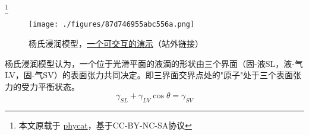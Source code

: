 
\begin{issues}
\issueDraft
\end{issues}

\footnote{本文原载于 \href{https://www.phycat.cn/archives/230/}{phycat}，基于CC-BY-NC-SA协议}

\begin{figure}[ht]
\centering
\texttt{[image: ./figures/87d746955abc556a.png]}
\caption{杨氏浸润模型，\href{https://www.phycat.cn/archives/230/}{一个可交互的演示}（站外链接）} \label{fig_YNGMDL_1}
\end{figure}
杨氏浸润模型认为，一个位于光滑平面的液滴的形状由三个界面（固-液SL，液-气LV，固-气SV）的表面张力共同决定。即三界面交界点处的"原子"处于三个表面张力的受力平衡状态。
\begin{equation}
\gamma_{SL}+\gamma_{LV}\cos\theta=\gamma_{SV}
\end{equation}
